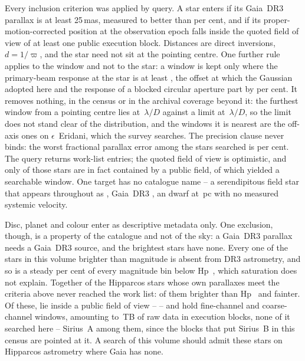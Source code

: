 Every inclusion criterion was applied by query. A star enters
if its Gaia~DR3 parallax is at least 25\,mas, measured to better than
\PlxAdqlPct{} per cent, and if its proper-motion-corrected position at the
observation epoch falls inside the quoted field of view of at least one
public execution block. Distances are direct inversions, $d=1/\varpi$, and
the star need not sit at the pointing centre. One further rule applies to the
window and not to the star: a window is kept only where the primary-beam
response at the star is at least \BmFloorResp, the offset at which the
Gaussian adopted here and the response of a blocked circular aperture
part by \BmFloorTolPct{} per cent. It removes nothing, in the census or in
the archival coverage beyond it: the furthest window from a pointing centre
lies at \ExCWorstExt\,$\lambda/D$ against a limit at
\BmFloorC\,$\lambda/D$, so the limit does not stand clear of the
distribution, and the windows it is nearest are the off-axis ones on
$\epsilon$~Eridani, which the survey searches.
The precision clause never binds: the worst fractional parallax
error among the stars searched is \SfPlxWorstPct{} per cent. The query returns
\NCensus{} work-list entries; the quoted field of view is optimistic, and
only \NGenuinelyCovered{} of those stars are in fact contained by a public
field, of which \NStars{} yielded a searchable window. One target has no
catalogue name -- a serendipitous field star that appears throughout as
\BkAlmaName, Gaia~DR3 \BkAlmaGaia, an \BkAlmaSpType{} dwarf at
\BkAlmaDistPc\,pc with no measured systemic velocity.

Disc, planet and colour enter as descriptive metadata only. One exclusion,
though, is a property of the catalogue and not of the sky: a Gaia~DR3
parallax needs a Gaia~DR3 source, and the brightest stars have none. Every
one of the \BsNBright{} stars in this volume brighter than \BsBrightMag{}
magnitude is absent from DR3 astrometry, and so is a steady
\BsGapFaintPct{} per cent of every magnitude bin below Hp~\BsGapMagCut,
which saturation does not explain. Together \BsNGap{} of the \BsNVol{} Hipparcos stars whose own parallaxes
meet the criteria above never reached the work list: \BsGapNBright{} of them
brighter than Hp~\BsGapMagCut{} and \BsGapNFaint{} fainter. Of these,
\BsNAlmaWord{} lie inside a public field of view -- \BsStarList{} -- and
hold \BsNWinA{} fine-channel and \BsNWinB{} coarse-channel windows, amounting
to \BsRawTB\,TB of raw data in \BsNEB{} execution blocks, none of it searched
here -- Sirius~A among them, since the \BsSirNEBWord{} blocks that put
Sirius~B in this census are pointed at it. A search of
this volume should admit these stars on Hipparcos astrometry where Gaia has
none.

